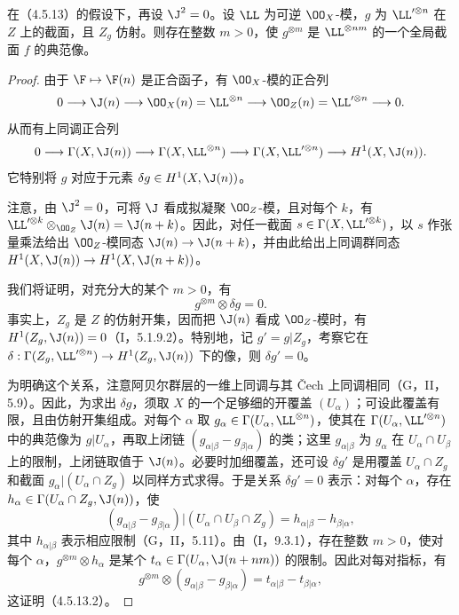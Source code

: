 在（4.5.13）的假设下，再设 $\J^2=0$。设 $\LL$ 为可逆 $\OO_X$-模，$g$ 为 $\LL'^{\otimes n}$ 在 $Z$ 上的截面，且 $Z_g$ 仿射。则存在整数 $m>0$，使 $g^{\otimes m}$ 是 $\LL^{\otimes nm}$ 的一个全局截面 $f$ 的典范像。
\begin{proof}
由于 $\F\mapsto\F(n)$ 是正合函子，有 $\OO_X$-模的正合列
\[
0\longrightarrow\J(n)\longrightarrow\OO_X(n)=\LL^{\otimes n}
\longrightarrow\OO_Z(n)=\LL'^{\otimes n}\longrightarrow0.
\]
从而有上同调正合列
\[
\begin{split}
0\longrightarrow\Gamma(X,\J(n))\longrightarrow\Gamma(X,\LL^{\otimes n})
\longrightarrow\Gamma(X,\LL'^{\otimes n})
\longrightarrow H^1(X,\J(n)).
\end{split}
\]
它特别将 $g$ 对应于元素 $\delta g\in H^1(X,\J(n))$。

注意，由 $\J^2=0$，可将 $\J$ 看成拟凝聚 $\OO_Z$-模，且对每个 $k$，有
$\LL'^{\otimes k}\otimes_{\OO_Z}\J(n)=\J(n+k)$。因此，对任一截面
$s\in\Gamma(X,\LL'^{\otimes k})$，以 $s$ 作张量乘法给出 $\OO_Z$-模同态
$\J(n)\to\J(n+k)$，并由此给出上同调群同态
$H^1(X,\J(n))\to H^1(X,\J(n+k))$。

我们将证明，对充分大的某个 $m>0$，有
\begin{equation}
g^{\otimes m}\otimes\delta g=0.\tag{4.5.13.2}
\end{equation}
事实上，$Z_g$ 是 $Z$ 的仿射开集，因而把 $\J(n)$ 看成 $\OO_Z$-模时，有
$H^1(Z_g,\J(n))=0$（I，5.1.9.2）。特别地，记 $g'=g|Z_g$，考察它在
$\delta:\Gamma(Z_g,\LL'^{\otimes n})\to H^1(Z_g,\J(n))$ 下的像，则 $\delta g'=0$。

为明确这个关系，注意阿贝尔群层的一维上同调与其 Čech 上同调相同（G，II，5.9）。因此，为求出 $\delta g$，须取 $X$ 的一个足够细的开覆盖 $(U_\alpha)$；可设此覆盖有限，且由仿射开集组成。对每个 $\alpha$ 取
$g_\alpha\in\Gamma(U_\alpha,\LL^{\otimes n})$，使其在
$\Gamma(U_\alpha,\LL'^{\otimes n})$ 中的典范像为 $g|U_\alpha$，再取上闭链
$(g_{\alpha|\beta}-g_{\beta|\alpha})$ 的类；这里 $g_{\alpha|\beta}$ 为 $g_\alpha$ 在 $U_\alpha\cap U_\beta$ 上的限制，上闭链取值于 $\J(n)$。必要时加细覆盖，还可设 $\delta g'$ 是用覆盖 $U_\alpha\cap Z_g$ 和截面 $g_\alpha|(U_\alpha\cap Z_g)$ 以同样方式求得。于是关系 $\delta g'=0$ 表示：对每个 $\alpha$，存在
$h_\alpha\in\Gamma(U_\alpha\cap Z_g,\J(n))$，使
\[
(g_{\alpha|\beta}-g_{\beta|\alpha})|(U_\alpha\cap U_\beta\cap Z_g)
=h_{\alpha|\beta}-h_{\beta|\alpha},
\]
其中 $h_{\alpha|\beta}$ 表示相应限制（G，II，5.11）。由（I，9.3.1），存在整数 $m>0$，使对每个 $\alpha$，$g^{\otimes m}\otimes h_\alpha$ 是某个
$t_\alpha\in\Gamma(U_\alpha,\J(n+nm))$ 的限制。因此对每对指标，有
\[
g^{\otimes m}\otimes(g_{\alpha|\beta}-g_{\beta|\alpha})
=t_{\alpha|\beta}-t_{\beta|\alpha},
\]
这证明（4.5.13.2）。


\end{proof}
